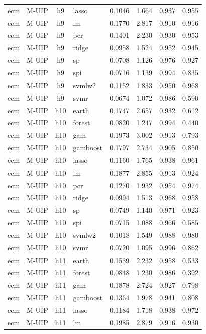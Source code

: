 \begin{ThreePartTable}
\begin{longtable}[t]{llclcccc}
ecm & M-UIP & h9 & lasso & 0.1046 & 1.664 & 0.937 & 0.955\\
ecm & M-UIP & h9 & lm & 0.1770 & 2.817 & 0.910 & 0.916\\
ecm & M-UIP & h9 & pcr & 0.1401 & 2.230 & 0.930 & 0.953\\
ecm & M-UIP & h9 & ridge & 0.0958 & 1.524 & 0.952 & 0.945\\
ecm & M-UIP & h9 & sp & 0.0708 & 1.126 & 0.976 & 0.927\\
ecm & M-UIP & h9 & spi & 0.0716 & 1.139 & 0.994 & 0.835\\
ecm & M-UIP & h9 & svmlw2 & 0.1152 & 1.833 & 0.950 & 0.968\\
ecm & M-UIP & h9 & svmr & 0.0674 & 1.072 & 0.986 & 0.590\\
\addlinespace
ecm & M-UIP & h10 & earth & 0.1747 & 2.657 & 0.932 & 0.612\\
ecm & M-UIP & h10 & forest & 0.0820 & 1.247 & 0.994 & 0.440\\
ecm & M-UIP & h10 & gam & 0.1973 & 3.002 & 0.913 & 0.793\\
ecm & M-UIP & h10 & gamboost & 0.1797 & 2.734 & 0.905 & 0.850\\
ecm & M-UIP & h10 & lasso & 0.1160 & 1.765 & 0.938 & 0.961\\
ecm & M-UIP & h10 & lm & 0.1877 & 2.855 & 0.913 & 0.924\\
ecm & M-UIP & h10 & pcr & 0.1270 & 1.932 & 0.954 & 0.974\\
ecm & M-UIP & h10 & ridge & 0.0994 & 1.513 & 0.968 & 0.958\\
ecm & M-UIP & h10 & sp & 0.0749 & 1.140 & 0.971 & 0.923\\
ecm & M-UIP & h10 & spi & 0.0715 & 1.088 & 0.966 & 0.585\\
ecm & M-UIP & h10 & svmlw2 & 0.1018 & 1.549 & 0.988 & 0.980\\
ecm & M-UIP & h10 & svmr & 0.0720 & 1.095 & 0.996 & 0.862\\
\addlinespace
ecm & M-UIP & h11 & earth & 0.1539 & 2.232 & 0.958 & 0.533\\
ecm & M-UIP & h11 & forest & 0.0848 & 1.230 & 0.986 & 0.392\\
ecm & M-UIP & h11 & gam & 0.1878 & 2.724 & 0.927 & 0.798\\
ecm & M-UIP & h11 & gamboost & 0.1364 & 1.978 & 0.941 & 0.808\\
ecm & M-UIP & h11 & lasso & 0.1184 & 1.718 & 0.938 & 0.972\\
ecm & M-UIP & h11 & lm & 0.1985 & 2.879 & 0.916 & 0.930\\

\end{longtable}
\end{ThreePartTable}
